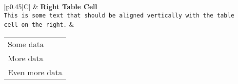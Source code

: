 \documentclass{article}
\begin{document}
\begin{table}[h]
    \centering
    \begin{tabular}{|p{}|C|}
        \hline
         & \textbf{Right Table Cell} \\ \hline
        \texttt{This is some text that should be aligned vertically with the table cell on the right.} & 
        \begin{tabular}{@{}m{}@{}}
            Some data \\
            More data \\
            Even more data
        \end{tabular} \\ \hline
    \end{tabular}
    
    \vspace*{-\baselineskip} %
    
\end{table}
\end{document}
